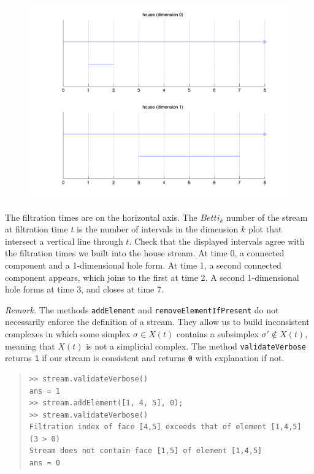 \documentclass[amscd, amssymb, verbatim]{amsart}[12pt]
\theoremstyle{remark}
\theoremstyle{remark}
\theoremstyle{remark}
\begin{document}
\begin{figure}[htp]
	\begin{center}
    	\includegraphics[width=6in]{house.png}
   	\end{center}
\end{figure}
\FloatBarrier

The filtration times are on the horizontal axis. The $Betti_k$ number of the stream at filtration time $t$ is the number of intervals in the dimension $k$ plot that intersect a vertical line through $t$. Check that the displayed intervals agree with the filtration times we built into the house stream. At time 0, a connected component and a 1-dimensional hole form. At time 1, a second connected component appears, which joins to the first at time 2. A second 1-dimensional hole forms at time 3, and closes at time 7. 

{\em Remark.} The methods \texttt{addElement} and \texttt{removeElementIfPresent} do not necessarily enforce the definition of a stream. They allow us to build inconsistent complexes in which some simplex $\sigma \in X(t)$ contains a subsimplex $\sigma' \notin X(t)$, meaning that $X(t)$ is not a simplicial complex. The method \texttt{validateVerbose} returns \texttt{1} if our stream is consistent and returns \texttt{0} with explanation if not. 

\begin{quote} \begin{verbatim}
>> stream.validateVerbose()
ans = 1
>> stream.addElement([1, 4, 5], 0);
>> stream.validateVerbose()
Filtration index of face [4,5] exceeds that of element [1,4,5] (3 > 0)
Stream does not contain face [1,5] of element [1,4,5]
ans = 0
\end{verbatim} \end{quote}
\end{document}
